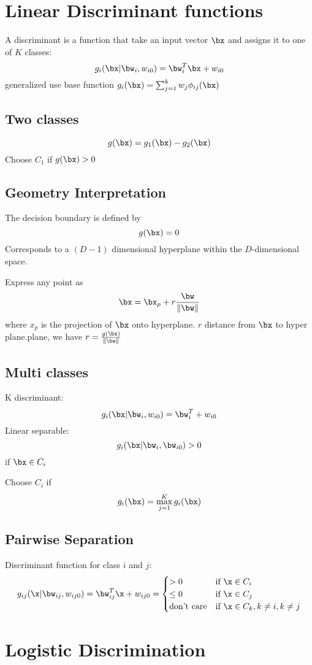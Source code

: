 \section{Linear Discriminant functions}
A discriminant is a function that take an input vector $\bx$ and assigns
it to one of $K$ classes:
\[g_i(\bx|\bw_i, w_{i0}) =\bw_i^T\bx + w_{i0}\] generalized use base
function $g_i(\bx) = \sum_{j=1}^k w_j \phi_{ij}(\bx)$
\subsection{Two classes}
\[g(\bx) = g_1(\bx) - g_2(\bx) \] 
Choose $C_1$ if $g(\bx)>0$

\subsection{Geometry Interpretation}
The decision boundary is defined by 
\[ g(\bx) = 0\]
Corresponds to a $(D-1)$ dimensional hyperplane within the $D$-dimensional
space.

    Express any point as 
    \[\bx = \bx_p  + r\frac{\bw}{\|\bw\|}\]
    where $x_p$ is the  projection of $\bx$ onto hyperplane. $r$ distance
    from $\bx$ to hyper plane.plane, we have $r=\frac{g(\bx)}{\|\bw\|}$
\subsection{Multi classes} 
K discriminant:
\[g_i(\bx |\bw_i, w_{i0}) = \bw_i^T + w_{i0}\]
Linear separable: \[g_i(\bx|\bw_i, \bw_{i0}) > 0\] if $\bx \in
        C_i$
        
        Choose $C_i$ if \[g_i(\bx) = \max_{j=1}^K g_i(\bx)\]

\subsection{Pairwise Separation} 
    Discriminant function for class $i$ and $j$:
        \[
            g_{ij} (\x|\bw_{ij}, w_{ij0}) = \bw_{ij}^T\x + w_{ij0} =
            \begin{cases}
                > 0 & \mbox{if } \x \in C_i\\
                \leq 0 & \mbox{if } \x \in C_j\\
                \mbox{don't care} & \mbox{if } \x \in C_k, k\neq i, k\neq j
            \end{cases} \]
\section{Logistic Discrimination}
